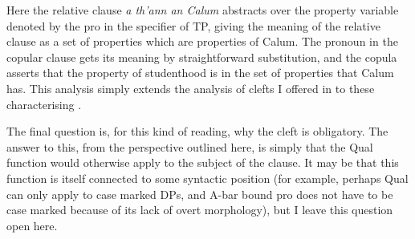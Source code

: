 \documentclass[output=paper]{langsci/langscibook}
\begin{document}
\ea
\hspace*{-2.5em}
\z
Here the relative clause \emph{a th'ann an Calum} abstracts over the property
variable denoted by the pro in the specifier of TP, giving the meaning of
the relative clause as a set of properties which are properties of Calum. The
pronoun in the copular clause gets its meaning by straightforward substitution,
and the copula asserts that the property of studenthood is in the set of
properties that Calum has. This analysis simply extends the analysis of clefts
I offered in \citep{Adger2011b} to these characterising
.

The final question is, for this kind of reading, why the cleft is
obligatory.  The answer to this, from the perspective outlined here, is simply
that the Qual function would otherwise apply to the subject of the clause. It
may be that this function is itself connected to some syntactic position (for
example, perhaps Qual can only apply to case marked DPs, and A-bar bound pro
does not have to be case marked because of its lack of overt morphology), but I
leave this question open here.
\end{document}
